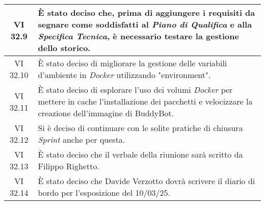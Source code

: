 \begin{table}[htbp]
\begin{tabular}{|c|p{}|}
        VI 32.9 & È stato deciso che, prima di aggiungere i requisiti da segnare come soddisfatti al \emph{Piano di Qualifica} e alla \emph{Specifica Tecnica}, è necessario testare la gestione dello storico.\\
        \hline
        VI 32.10 & È stato deciso di migliorare la gestione delle variabili d’ambiente in \emph{Docker} utilizzando "environment". \\
        \hline
        VI 32.11 & È stato deciso di esplorare l’uso dei volumi \emph{Docker} per mettere in cache l’installazione dei pacchetti e velocizzare la creazione dell’immagine di BuddyBot.\\
        \hline
        VI 32.12 & Si è deciso di continuare con le solite pratiche di chiusura \emph{Sprint} anche per questa. \\
        \hline
        VI 32.13 & È stato deciso che il verbale della riunione sarà scritto da Filippo Righetto. \\
        \hline
        VI 32.14 & È stato deciso che Davide Verzotto dovrà scrivere il diario di bordo per l'esposizione del 10/03/25. \\
        \hline
    \end{tabular}
\end{table}